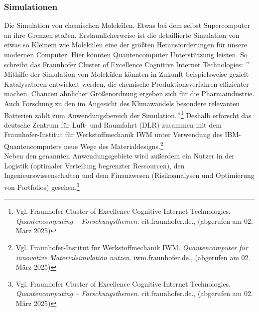 \subsubsection{Simulationen}
\label{subsubsec:simulationen}
Die Simulation von chemischen Molekülen.
Etwas bei dem selbst Supercomputer an ihre Grenzen stoßen.
Erstaunlicherweise ist die detaillierte Simulation von etwas so Kleinem wie Molekülen eine der größten Herausforderungen für unsere modernen Computer.
Hier könnten Quantencomputer Unterstützung leisten.
So schreibt das Fraunhofer Cluster of Excellence Cognitive Internet Technologies:
\("\) Mithilfe der Simulation von Molekülen könnten in Zukunft beispielsweise gezielt Katalysatoren entwickelt werden, die chemische Produktionsverfahren effizienter machen.
Chancen ähnlicher Größenordnung ergeben sich für die Pharmaindustrie.
Auch Forschung zu den im Angesicht des Klimawandels besondere relevanten Batterien zählt zum Anwendungsbereich der Simulation.\("\)\footnote{Vgl. Fraunhofer Cluster of Excellence Cognitive Internet Technologies. \textit{Quantencomputing – Forschungsthemen}. cit.fraunhofer.de., \href{https://www.cit.fraunhofer.de/de/Forschungsthemen/quantencomputing.html} (abgerufen am 02. März 2025)}
Deshalb erforscht das deutsche Zentrum für Luft- und Raumfahrt (DLR) zusammen mit dem Fraunhofer-Institut für Werkstoffmechanik IWM unter Verwendung des IBM-Quantencomputers neue Wege des Materialdesigns.\footnote{Vgl. Fraunhofer-Institut für Werkstoffmechanik IWM. \textit{Quantencomputer für innovative Materialsimulation nutzen}. iwm.fraunhofer.de., \href{https://www.iwm.fraunhofer.de/de/geschaeftsfelder/werkstoffbewertung-lebensdauerkonzepte/materialmodellierung/quantencomputer_innovative_materialsimulation_nutzen.html} (abgerufen am 02. März 2025)}\\

Neben den genannten Anwendungsgebiete wird außerdem ein Nutzer in der Logistik (optimaler Verteilung begrenzter Ressourcen), den Ingenieurswissenschaften und dem Finanzwesen (Risikoanalysen und Optimierung von Portfolios) gesehen.\footnote{Vgl. Fraunhofer Cluster of Excellence Cognitive Internet Technologies. \textit{Quantencomputing – Forschungsthemen}. cit.fraunhofer.de., \href{https://www.cit.fraunhofer.de/de/Forschungsthemen/quantencomputing.html} (abgerufen am 02. März 2025)}\\








